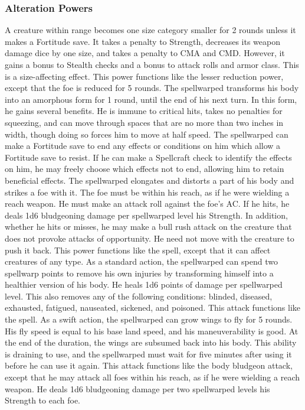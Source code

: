 \subsubsection{Alteration Powers}
 A creature within \rngclose range becomes one size category smaller for 2 rounds unless it makes a Fortitude save. It takes a  penalty to Strength, decreases its weapon damage dice by one size, and takes a  penalty to CMA and CMD. However, it gains a  bonus to Stealth checks and a  bonus to attack rolls and armor class. This is a size-affecting effect.
 This power functions like the lesser reduction power, except that the foe is reduced for 5 rounds.
 The spellwarped transforms his body into an amorphous form for 1 round, until the end of his next turn. In this form, he gains several benefits. He is immune to critical hits, takes no penalties for squeezing, and can move through spaces that are no more than two inches in width, though doing so forces him to move at half speed.
 The spellwarped can make a Fortitude save to end any effects or conditions on him which allow a Fortitude save to resist. If he can make a Spellcraft check to identify the effects on him, he may freely choose which effects not to end, allowing him to retain beneficial effects.
 The spellwarped elongates and distorts a part of his body and strikes a foe with it. The foe must be within his reach, as if he were wielding a reach weapon. He must make an attack roll against the foe's AC. If he hits, he deals 1d6 bludgeoning damage per spellwarped level \add his Strength. In addition, whether he hits or misses, he may make a bull rush attack on the creature that does not provoke attacks of opportunity. He need not move with the creature to push it back.
 This power functions like the  spell, except that it can affect creatures of any type.
 As a standard action, the spellwarped can spend two spellwarp points to remove his own injuries by transforming himself into a healthier version of his body. He heals 1d6 points of damage per spellwarped level. This also removes any of the following conditions: blinded, diseased, exhausted, fatigued, nauseated, sickened, and poisoned.
 This attack functions like the  spell.
 As a swift action, the spellwarped can grow wings to fly for 5 rounds. His fly speed is equal to his base land speed, and his maneuverability is good. At the end of the duration, the wings are subsumed back into his body. This ability is draining to use, and the spellwarped must wait for five minutes after using it before he can use it again.
 This attack functions like the body bludgeon attack, except that he may attack all foes within his reach, as if he were wielding a reach weapon. He deals 1d6 bludgeoning damage per two spellwarped levels \add his Strength to each foe.

